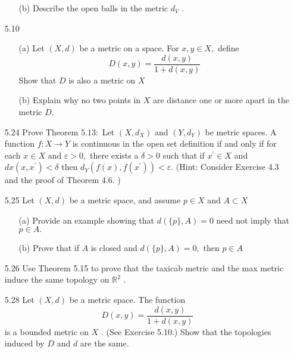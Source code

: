 \documentclass[12pt]{article}
\begin{document}
\begin{enumerate}
\begin{enumerate}
		\item[(b)] 	Describe the open balls in the metric $d _ { V }$ .
	\end{enumerate}
	\item[5.10]
	\begin{enumerate}
		\item[(a)] Let $( X , d )$ be a metric on a space. For $x , y \in X ,$ define
		\[D ( x , y ) = \frac { d ( x , y ) } { 1 + d ( x , y ) }\]
		Show that $D$ is also a metric on $ X $
		
		\item[(b)] Explain why no two points in $X$ are distance one or more apart in the
		metric $D .$
	\end{enumerate}
	
	\item[5.24] Prove Theorem $5.13 :$ Let $\left( X , d _ { X } \right)$ and $\left( Y , d _ { Y } \right)$ be metric spaces. A function
	$f : X \rightarrow Y$ is continuous in the open set definition if and only if for each $x \in X$ and $\varepsilon > 0 ,$ there exists a $\delta > 0$ such that if $x ^ { \prime } \in X$ and $d x \left( x , x ^ { \prime } \right) < \delta$
	then $d _ { Y } \left( f ( x ) , f \left( x ^ { \prime } \right) \right) < \varepsilon .$ (Hint: Consider Exercise 4.3 and the proof of
	Theorem $4.6 .$ )
	
	\item[5.25] Let $( X , d )$ be a metric space, and assume $p \in X$ and $A \subset X$
	\begin{enumerate}
		\item[(a)] Provide an example showing that $d ( \{ p \} , A ) = 0$ need not imply that $p \in A .$
		
		\item[(b)] Prove that if $A$ is closed and $d ( \{ p \} , A ) = 0 ,$ then $p \in A$
		
	\end{enumerate}
	
	\item[5.26] Use Theorem 5.15 to prove that the taxicab metric and the max metric induce
	the same topology on $\mathbb { R } ^ { 2 }$ .
	
	\item[5.28] Let $( X , d )$ be a metric space. The function
		\[D ( x , y ) = \frac { d ( x , y ) } { 1 + d ( x , y ) }\]
	is a bounded metric on $X$ . (See Exercise 5.10.) Show that the topologies
	induced by $D$ and $d$ are the same.
	

\end{enumerate}
\end{document}
